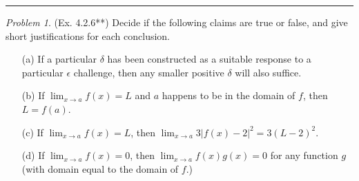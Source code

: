 \documentclass[11pt,twoside, reqno]{amsart}
\theoremstyle{remark}
\newtheorem{Prob}{Problem}
\begin{document}
\hrule
{}

\begin{Prob}(Ex. 4.2.6**) Decide if the following claims are true or false, and give short justifications for each conclusion.
\begin{enumerate}
    \item [(a)] If a particular $\delta$ has been constructed as a suitable response to a particular $\epsilon$ challenge, then any smaller positive $\delta$ will also suffice.
    \item [(b)] If $\lim_{x \to a} f(x) = L$ and $a$ happens to be in the domain of $f$, then $L = f(a)$.
    \item [(c)] If $\lim_{x \to a} f(x) = L$, then $\lim_{x \to a} 3|f(x) - 2|^2 = 3(L-2)^2$.
    \item [(d)] If $\lim_{x \to a} f(x) = 0$, then $\lim_{x \to a} f(x)g(x) = 0$ for any function $g$ (with domain equal to the domain of $f$.)
\end{enumerate}
\end{Prob}
\end{document}
